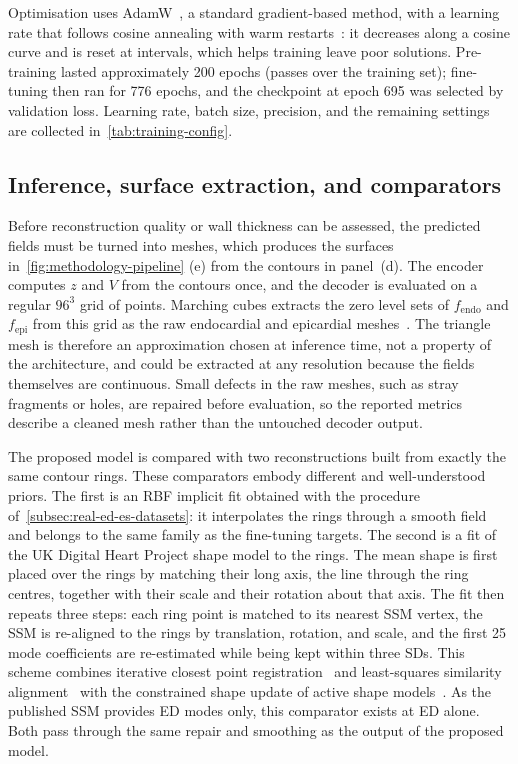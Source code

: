 Optimisation uses AdamW~\parencite{loshchilov2019adamw}, a standard
gradient-based method, with a learning rate that follows cosine annealing
with warm restarts~\parencite{loshchilov2017sgdr}: it decreases along a cosine
curve and is reset at intervals, which helps training leave poor solutions.
Pre-training lasted approximately 200 epochs (passes over the training set);
fine-tuning then ran for 776 epochs, and the checkpoint at epoch 695 was
selected by validation loss. Learning rate, batch size, precision, and the
remaining settings are collected in~\cref{tab:training-config}.

\subsection{Inference, surface extraction, and comparators}
\label{subsec:inference-offset-extraction}
\noindent
Before reconstruction quality or wall thickness can be assessed, the predicted
fields must be turned into meshes, which produces the surfaces
in~\cref{fig:methodology-pipeline} (e) from the contours in panel~(d).
The encoder computes $z$ and $V$ from the contours once, and
the decoder is evaluated on a regular $96^3$ grid of points. Marching cubes
extracts the zero level sets of $f_{\mathrm{endo}}$ and $f_{\mathrm{epi}}$ from
this grid as the raw endocardial and epicardial meshes~\parencite{lorensen1987marchingcubes}. The triangle mesh is therefore an approximation chosen
at inference time, not a property of the architecture, and could be extracted
at any resolution because the fields themselves are continuous. Small
defects in the raw meshes, such as stray fragments or holes, are repaired
before evaluation, so the reported metrics describe a cleaned mesh rather
than the untouched decoder output.

The proposed model is compared with two reconstructions built from exactly the same
contour rings. These comparators embody different and well-understood
priors. The first is an RBF implicit fit obtained with the procedure of~\cref{subsec:real-ed-es-datasets}: it interpolates the rings through a smooth
field and belongs to the same family as the fine-tuning targets. The second is
a fit of the UK Digital Heart Project shape model to the rings. The mean
shape is first placed over the rings by matching their long axis, the line
through the ring centres, together with their scale and their rotation about
that axis. The fit then repeats three steps: each ring point is matched to
its nearest SSM vertex, the SSM is re-aligned to the rings by translation,
rotation, and scale, and the first 25 mode coefficients are re-estimated
while being kept within three SDs. This scheme combines iterative closest
point registration~\parencite{besl1992icp} and least-squares similarity
alignment~\parencite{umeyama1991similarity} with the constrained shape
update of active shape models~\parencite{cootes1995asm}. As the published SSM
provides ED
modes only, this comparator exists at ED alone. Both pass through the same
repair and smoothing as the output of the proposed model.

